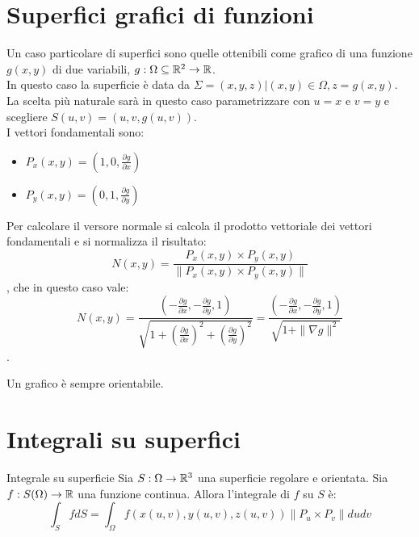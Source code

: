 \section{Superfici grafici di funzioni}
Un caso particolare di superfici sono quelle ottenibili come grafico di una funzione $g(x,y)$ di due variabili, $g:\Omega \subseteq \mathbb{R}^2  \to \mathbb{R}$.\\
In questo caso la superficie è data da $\Sigma = {(x,y,z)|(x,y)\in \Omega, z=g(x,y)}$.\\
La scelta più naturale sarà in questo caso parametrizzare con $u=x$ e $v=y$ e scegliere $S(u,v)=(u,v,g(u,v))$.\\
I vettori fondamentali sono:
\begin{itemize}
  \item $P_x(x,y)=(1,0,\frac{\partial g}{\partial x})$
  \item $P_y(x,y)=(0,1,\frac{\partial g}{\partial y})$
\end{itemize}
Per calcolare il versore normale si calcola il prodotto vettoriale dei vettori fondamentali e si normalizza il risultato:
$$N(x,y)=\frac{P_x(x,y)\times P_y(x,y)}{\|P_x(x,y)\times P_y(x,y)\|}$$, che in questo caso vale:
$$N(x,y)=\frac{(-\frac{\partial g}{\partial x},-\frac{\partial g}{\partial y},1)}{\sqrt{1+(\frac{\partial g}{\partial x})^2+(\frac{\partial g}{\partial y})^2}}=\frac{(-\frac{\partial g}{\partial x},-\frac{\partial g}{\partial y},1)}{\sqrt{1+\|\nabla g\|^2}}$$.

\begin{osservazione}{}
  Un grafico è sempre orientabile.
\end{osservazione}

\section{Integrali su superfici}
\begin{definizione}{Integrale su superficie}
  Sia $S:\Omega\to\mathbb{R}^3$ una superficie regolare e orientata. Sia $f:S(\Omega)\to\mathbb{R}$ una funzione continua. Allora l'integrale di $f$ su $S$ è:
  $$\int_{S} f dS = \int_{\Omega} f(x(u,v),y(u,v),z(u,v))\|P_u\times P_v\|dudv$$
\end{definizione}

